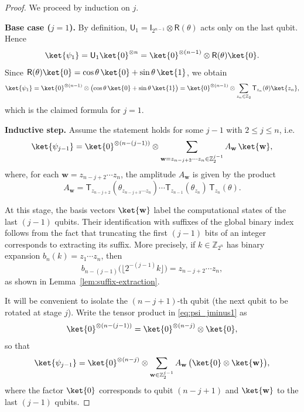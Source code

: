 \documentclass{article}
\newcommand{\rI}{\mathsf{I}}
\newcommand{\rR}{\mathsf{R}}
\newcommand{\rU}{\mathsf{U}}
\numberwithin{equation}{section}
\begin{document}
\begin{proof}
We proceed by induction on $j$.

\smallskip
\noindent\textbf{Base case ($j=1$).}
By definition, $\rU_1=\rI_{2^{n-1}}\otimes \rR(\theta)$ acts only on the last qubit. Hence
\[
\ket{\psi_1}
=\rU_1\ket{0}^{\otimes n}
=\ket{0}^{\otimes(n-1)}\otimes \rR(\theta)\ket{0}.
\]
Since $\rR(\theta)\ket{0}=\cos\theta\,\ket{0}+\sin\theta\,\ket{1}$, we obtain
\[
\ket{\psi_1}
=\ket{0}^{\otimes(n-1)}\otimes\bigl(\cos\theta\,\ket{0}+\sin\theta\,\ket{1}\bigr)
=\ket{0}^{\otimes(n-1)}\otimes\sum_{z_n\in\mathbb{Z}_2}\mathsf{T}_{z_n}(\theta)\ket{z_n},
\]
which is the claimed formula for $j=1$.

\smallskip
\noindent\textbf{Inductive step.}
Assume the statement holds for some $j-1$ with $2\le j\le n$, i.e.
\begin{equation}\label{eq:psi_jminus1}
\ket{\psi_{j-1}}
=
\ket{0}^{\otimes (n-(j-1))}\otimes
\sum_{\mathbf{w}=z_{n-j+2}\cdots z_n\in\mathbb{Z}_2^{j-1}}
A_{\mathbf{w}}\,\ket{\mathbf{w}},
\end{equation}
where, for each $\mathbf{w}=z_{n-j+2}\cdots z_n$, the amplitude $A_{\mathbf{w}}$ is given by the product
\begin{equation}\label{eq:Aw_def}
A_{\mathbf{w}}
=
\mathsf{T}_{z_{n-j+2}}(\theta_{z_{n-j+3}\cdots z_n})\cdots
\mathsf{T}_{z_{n-1}}(\theta_{z_n})\,
\mathsf{T}_{z_n}(\theta).
\end{equation}

At this stage, the basis vectors $\ket{\mathbf{w}}$ label the computational states of the last $(j-1)$ qubits.
Their identification with suffixes of the global binary index follows from the fact that truncating
the first $(j-1)$ bits of an integer corresponds to extracting its suffix.
More precisely, if $k\in\mathbb{Z}_{2^n}$ has binary expansion $b_n(k)=z_1\cdots z_n$, then
\[
b_{n-(j-1)}\!\bigl(\lfloor 2^{-(j-1)}k\rfloor\bigr)=z_{n-j+2}\cdots z_n,
\]
as shown in Lemma~\ref{lem:suffix-extraction}.



It will be convenient to isolate the $(n-j+1)$-th qubit (the next qubit to be rotated at stage $j$).
Write the tensor product in \eqref{eq:psi_jminus1} as
\[
\ket{0}^{\otimes(n-(j-1))}
=\ket{0}^{\otimes(n-j)}\otimes \ket{0},
\]
so that
\begin{equation}\label{eq:psi_jminus1_rewrite}
\ket{\psi_{j-1}}
=
\ket{0}^{\otimes(n-j)}\otimes
\sum_{\mathbf{w}\in\mathbb{Z}_2^{j-1}} A_{\mathbf{w}}\,\bigl(\ket{0}\otimes\ket{\mathbf{w}}\bigr),
\end{equation}
where the factor $\ket{0}$ corresponds to qubit $(n-j+1)$ and $\ket{\mathbf{w}}$ to the last $(j-1)$ qubits.


\end{proof}
\end{document}
